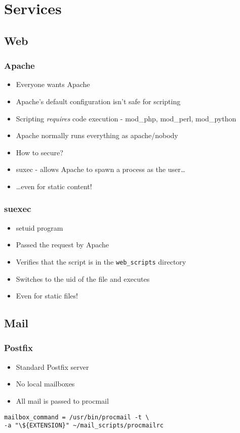 \section{Services}

\subsection{Web}
\begin{frame}
  \frametitle{Apache}
  \begin{itemize}
      \item Everyone wants Apache
      \item Apache's default configuration isn't safe for scripting
      \item Scripting \emph{requires} code execution - mod\_php, mod\_perl, mod\_python
      \item Apache normally runs everything as apache/nobody
      \item How to secure?
      \pause
      \item suxec - allows Apache to spawn a process as the user\ldots
      \item {\ldots}even for static content!
  \end{itemize}
\end{frame}

\begin{frame}
  \frametitle{suexec}
  \begin{itemize}
    \item setuid program
    \item Passed the request by Apache
    \item Verifies that the script is in the {\tt web\_scripts} directory
    \item Switches to the uid of the file and executes
    \item Even for static files!
  \end{itemize}
\end{frame}

\subsection{Mail}

\begin{frame}[fragile]
  \frametitle{Postfix}
  \begin{itemize}
    \item Standard Postfix server
    \item No local mailboxes
    \item All mail is passed to procmail
  \end{itemize}
  \begin{verbatim}mailbox_command = /usr/bin/procmail -t \
-a "\${EXTENSION}" ~/mail_scripts/procmailrc\end{verbatim}
\end{frame}

